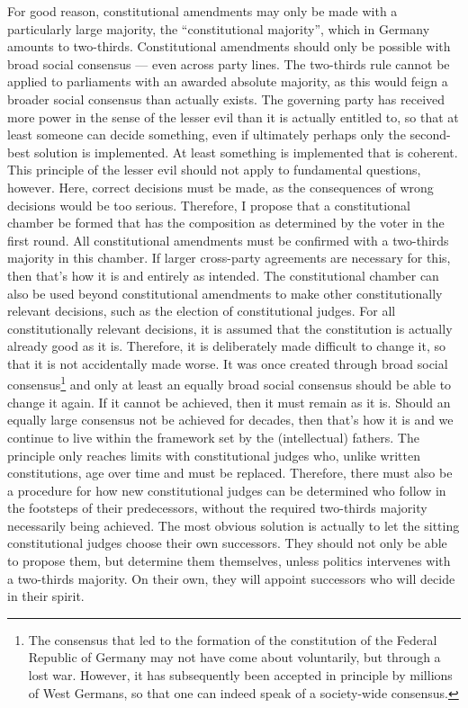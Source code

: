 For good reason, constitutional amendments may only be made with a particularly large majority, the
\enquote{constitutional majority}, which in Germany amounts to two-thirds. Constitutional amendments should only be possible with broad social consensus ---
even across party lines. The two-thirds rule cannot be applied to parliaments with
an awarded absolute majority, as this would feign a broader social
consensus than actually exists. The governing party has received more power in the sense of the
lesser evil than it is actually entitled to, so that at least someone can
decide something, even if ultimately perhaps only the second-best solution is implemented.
At least something is implemented that is coherent.
This principle of the lesser evil should not apply to fundamental questions, however.
Here, correct decisions must be made, as the consequences of wrong decisions would be too serious.
Therefore, I propose that a constitutional chamber be formed that has the composition
as determined by the voter in the first round. All constitutional amendments must be
confirmed with a two-thirds majority in this chamber. If larger cross-party
agreements are necessary for this, then that's how it is and entirely as intended.
The constitutional chamber can also be used beyond constitutional amendments to make other
constitutionally relevant decisions, such as the election of
constitutional judges.
For all constitutionally relevant decisions, it is assumed that the constitution
is actually already good as it is. Therefore, it is deliberately made difficult to change it,
so that it is not accidentally made worse. It was once created through broad
social consensus\footnote{The consensus that led to the formation of the constitution
of the Federal Republic of Germany may not have come about voluntarily, but
through a lost war. However, it has subsequently been accepted in principle by millions of West Germans,
so that one can indeed speak of a society-wide consensus.} and only at least an equally broad social consensus should be able to
change it again. If it cannot be achieved, then it must remain as it is.
Should an equally large consensus not be achieved for decades, then that's how it is and
we continue to live within the framework set by the (intellectual) fathers. The principle only reaches
limits with constitutional judges who, unlike written constitutions,
age over time and must be replaced. Therefore, there must also be a procedure for how new
constitutional judges can be determined who follow in the footsteps of their predecessors, without
the required two-thirds majority necessarily being achieved. The most obvious solution is
actually to let the sitting constitutional judges choose their own successors. They
should not only be able to propose them, but determine them themselves, unless politics intervenes
with a two-thirds majority. On their own, they will appoint successors who will
decide in their spirit.

